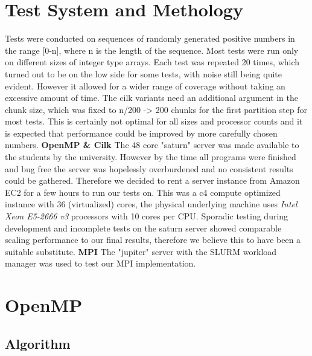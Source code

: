 \documentclass[12pt,a4paper]{article}
\begin{document}
\section{Test System and Methology}
Tests were conducted on sequences of randomly generated positive numbers in the range [0-n], where n is the length of the sequence. Most tests were run only on different sizes of integer type arrays. Each test was repeated 20 times, which turned out to be on the low side for some tests, with noise still being quite evident. However it allowed for a wider range of coverage without taking an excessive amount of time. The cilk variants need an additional argument in the chunk size, which was fixed to n/200 -> 200 chunks for the first partition step for most tests. This is certainly not optimal for all sizes and processor counts and it is expected that performance could be improved by more carefully chosen numbers.\newline\newline
\textbf{OpenMP \& Cilk}\newline
The 48 core "saturn" server was made available to the students by the university. However by the time all programs were finished and bug free the server was hopelessly overburdened and no consistent results could be gathered. Therefore we decided to rent a server instance from Amazon EC2 for a few hours to run our tests on. This was a c4 compute optimized instance with 36 (virtualized) cores, the physical underlying machine uses \emph{Intel Xeon E5-2666 v3} processors with 10 cores per CPU. Sporadic testing during development and incomplete tests on the saturn server showed comparable scaling performance to our final results, therefore we believe this to have been a suitable substitute.
\newline\newline
\textbf{MPI}\newline
The "jupiter" server with the SLURM workload manager was used to test our MPI implementation. 

\section{OpenMP}

\subsection{Algorithm}
\end{document}
